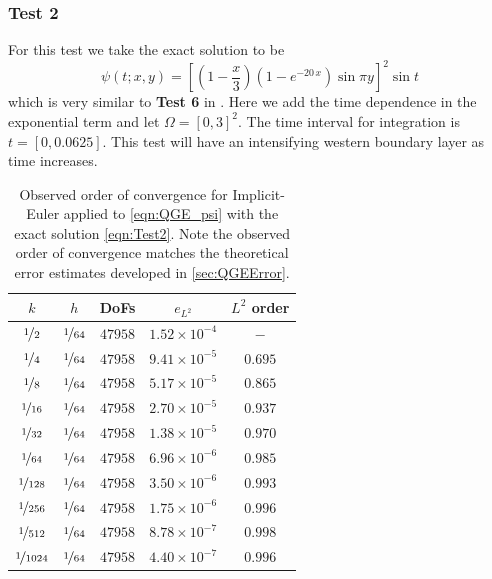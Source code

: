\subsubsection*{Test 2}
For this test we take the exact solution to be
\begin{equation}
  \psi(t;x,y) = \left[(1-\frac{x}{3})\left(1-e^{-20\,x}\right) \sin \pi
    y\right]^2 \sin t
  \label{eqn:Test2}
\end{equation}
which is very similar to \textbf{Test 6} in \cite{Foster}. Here we add the time
dependence in the exponential term and let $\Omega = [0,3]^2$. The time interval
for integration is $t = [0,0.0625]$. This test will have an intensifying western
boundary layer as time increases.
\begin{table}
\begin{center}
  \begin{tabular}{|c|c|c|c|c|}
    \hline
    $k$ & $h$ & DoFs & $e_{L^2}$ & $L^2$ order \\
    \hline
    $\nicefrac{1}{2}$ & $\nicefrac{1}{64}$ & $47958$ & $1.52\times 10^{-4}$ & $-$\\
    $\nicefrac{1}{4}$ & $\nicefrac{1}{64}$ & $47958$ & $9.41\times 10^{-5}$ & $0.695$\\
    $\nicefrac{1}{8}$ & $\nicefrac{1}{64}$ & $47958$ & $5.17\times 10^{-5}$ & $0.865$\\
    $\nicefrac{1}{16}$ & $\nicefrac{1}{64}$ & $47958$ & $2.70\times 10^{-5}$ & $0.937$\\
    $\nicefrac{1}{32}$ & $\nicefrac{1}{64}$ & $47958$ & $1.38\times 10^{-5}$ & $0.970$\\
    $\nicefrac{1}{64}$ & $\nicefrac{1}{64}$ & $47958$ & $6.96\times 10^{-6}$ & $0.985$\\
    $\nicefrac{1}{128}$ & $\nicefrac{1}{64}$ & $47958$ & $3.50\times 10^{-6}$ & $0.993$\\
    $\nicefrac{1}{256}$ & $\nicefrac{1}{64}$ & $47958$ & $1.75\times 10^{-6}$ & $0.996$\\
    $\nicefrac{1}{512}$ & $\nicefrac{1}{64}$ & $47958$ & $8.78\times 10^{-7}$ & $0.998$\\
    $\nicefrac{1}{1024}$ & $\nicefrac{1}{64}$ & $47958$ & $4.40\times 10^{-7}$ & $0.996$\\
    \hline
  \end{tabular}
\end{center}
  \caption{Observed order of convergence for Implicit-Euler applied to
    \eqref{eqn:QGE_psi} with the exact solution \eqref{eqn:Test2}. Note the observed
    order of convergence matches the theoretical error estimates developed in
    \autoref{sec:QGEError}.}
  \label{tab:Test2Time}
\end{table}


